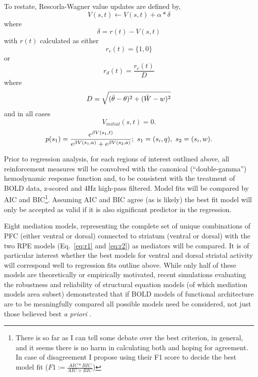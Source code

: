 \documentclass[doc,12pt]{apa}        %
\begin{document}
To restate, Rescorla-Wagner value updates are defined by,
\begin{equation} \label{eq:V} V(s,t) \leftarrow V(s,t) + \alpha*\delta \end{equation} where 
\begin{equation} \label{eq:rpe} \delta = r(t) - V(s,t) \end{equation}
with $r(t)$ calculated as either
\begin{equation}
	\label{eq:r1}
	r_{c}(t) = \{1,0\}
\end{equation}
or
\begin{equation}
	\label{eq:r2}
    r_{d}(t) = \frac{r_{c}(t)}{D}
\end{equation}
where
\begin{equation}
	\label{eq:D}\\
	D = \sqrt{(\bar{\theta} - \theta)^2 + (\bar{W}-w)^2}
\end{equation}
and in all cases
\begin{equation} \label{eq:V0} V_{initial}(s,t) = 0. \end{equation}
\begin{equation}
	\label{eq:softmax}
	p(s_1) = {e^{\beta V(s_1,t)}\over{e^{\beta V(s_1,a)} + e^{\beta V(s_2,a)}}};\ s_1 = (s_{i},q), \ s_2 = (s_{i}, w).
\end{equation}

Prior to regression analysis, for each regions of interest outlined above, all reinforcement measures will be convolved with the canonical (``double-gamma'') hemodynamic response function and, to be consistent with the treatment of BOLD data, z-scored and 4Hz high-pass filtered.  Model fits will be compared by AIC and BIC\footnote{There is so far as I can tell some debate over the best criterion, in general, and it seems there is no harm in calculating both and hoping for agreement.  In case of disagreement I propose using their F1 score to decide the best model fit ($F1 := \frac{AIC*BIC}{AIC+BIC}$) }. Assuming AIC and BIC agree (as is likely) the best fit model will only be accepted as valid if it is also significant predictor in the regression.

Eight mediation models, representing the complete set of unique combinations of PFC (either ventral or dorsal) connected to striatum (ventral or dorsal) with the two RPE models (Eq.~\ref{eq:r1} and \ref{eq:r2}) as mediators will be compared.   It is of particular interest whether the best models for ventral and dorsal striatal activity will correspond well to regression fits outline above. While only half of these models are theoretically or empirically motivated, recent simulations evaluating the robustness and reliability of structural equation models (of which mediation models area subset) demonstrated that if BOLD models of functional architecture are to be meaningfully compared all possible models need be considered, not just those believed best \emph{a priori} \cite{Lohmann:2011p8418}.
\end{document}
